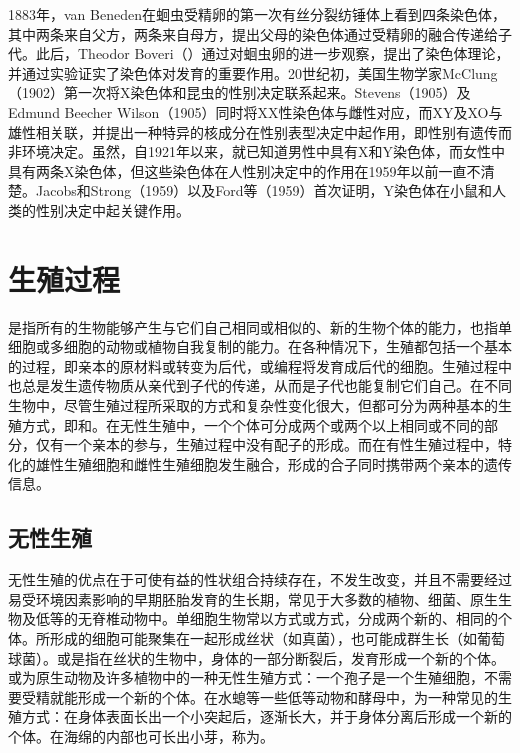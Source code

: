 1883年，van Beneden在蛔虫受精卵的第一次有丝分裂纺锤体上看到四条染色体，其中两条来自父方，两条来自母方，提出父母的染色体通过受精卵的融合传递给子代。此后，Theodor Boveri（）通过对蛔虫卵的进一步观察，提出了染色体理论，并通过实验证实了染色体对发育的重要作用。20世纪初，美国生物学家McClung（1902）第一次将X染色体和昆虫的性别决定联系起来。Stevens（1905）及Edmund Beecher Wilson（1905）同时将XX性染色体与雌性对应，而XY及XO与雄性相关联，并提出一种特异的核成分在性别表型决定中起作用，即性别有遗传而非环境决定。虽然，自1921年以来，就已知道男性中具有X和Y染色体，而女性中具有两条X染色体，但这些染色体在人性别决定中的作用在1959年以前一直不清楚。Jacobs和Strong（1959）以及Ford等（1959）首次证明，Y染色体在小鼠和人类的性别决定中起关键作用。

\section{生殖过程}

是指所有的生物能够产生与它们自己相同或相似的、新的生物个体的能力，也指单细胞或多细胞的动物或植物自我复制的能力。在各种情况下，生殖都包括一个基本的过程，即亲本的原材料或转变为后代，或编程将发育成后代的细胞。生殖过程中也总是发生遗传物质从亲代到子代的传递，从而是子代也能复制它们自己。在不同生物中，尽管生殖过程所采取的方式和复杂性变化很大，但都可分为两种基本的生殖方式，即和。在无性生殖中，一个个体可分成两个或两个以上相同或不同的部分，仅有一个亲本的参与，生殖过程中没有配子的形成。而在有性生殖过程中，特化的雄性生殖细胞和雌性生殖细胞发生融合，形成的合子同时携带两个亲本的遗传信息。

\subsection{无性生殖}

无性生殖的优点在于可使有益的性状组合持续存在，不发生改变，并且不需要经过易受环境因素影响的早期胚胎发育的生长期，常见于大多数的植物、细菌、原生生物及低等的无脊椎动物中。单细胞生物常以方式或方式，分成两个新的、相同的个体。所形成的细胞可能聚集在一起形成丝状（如真菌），也可能成群生长（如葡萄球菌）。或是指在丝状的生物中，身体的一部分断裂后，发育形成一个新的个体。或为原生动物及许多植物中的一种无性生殖方式：一个孢子是一个生殖细胞，不需要受精就能形成一个新的个体。在水螅等一些低等动物和酵母中，为一种常见的生殖方式：在身体表面长出一个小突起后，逐渐长大，并于身体分离后形成一个新的个体。在海绵的内部也可长出小芽，称为。

